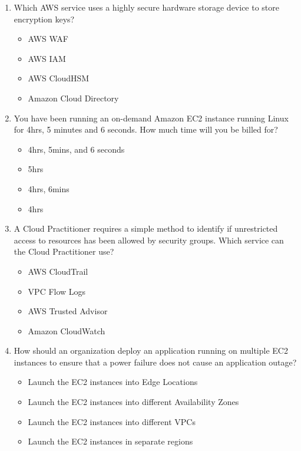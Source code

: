 \begin{enumerate}
	\item Which AWS service uses a highly secure hardware storage device to store encryption keys?
	\begin{itemize}
		\item AWS WAF
		\item AWS IAM
		\item AWS CloudHSM
		\item Amazon Cloud Directory
	\end{itemize}

	\item You have been running an on-demand Amazon EC2 instance running Linux for 4hrs, 5 minutes and 6 seconds. How much time will you be billed for?
	\begin{itemize}
		\item 4hrs, 5mins, and 6 seconds
		\item 5hrs
		\item 4hrs, 6mins
		\item 4hrs
	\end{itemize}

	\item A Cloud Practitioner requires a simple method to identify if unrestricted access to resources has been allowed by security groups. Which service can the Cloud Practitioner use?
	\begin{itemize}
		\item AWS CloudTrail
		\item VPC Flow Logs
		\item AWS Trusted Advisor
		\item Amazon CloudWatch
	\end{itemize}

	\item How should an organization deploy an application running on multiple EC2 instances to ensure that a power failure does not cause an application outage?
	\begin{itemize}
		\item Launch the EC2 instances into Edge Locations
		\item Launch the EC2 instances into different Availability Zones
		\item Launch the EC2 instances into different VPCs
		\item Launch the EC2 instances in separate regions
	\end{itemize}


\end{enumerate}

